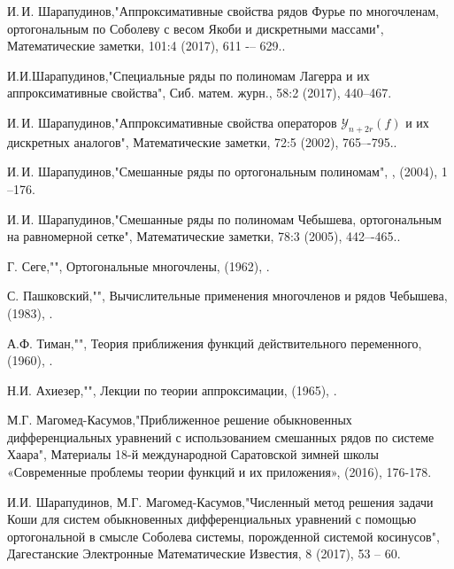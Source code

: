 \begin{thebibliography}{20}
И.\,И. Шарапудинов,"Аппроксимативные свойства рядов Фурье по многочленам, ортогональным по Соболеву с весом Якоби и дискретными массами", Математические заметки, 101:4 (2017), 611 -– 629..



И.И.Шарапудинов,"Специальные ряды по полиномам Лагерра и их аппроксимативные свойства", Сиб. матем. журн., 58:2 (2017), 440–467.



И.\,И. Шарапудинов,"Аппроксимативные свойства операторов $\mathcal{Y}_{n+2r}(f)$ и их дискретных аналогов", Математические заметки, 72:5 (2002), 765–-795..



И.\,И. Шарапудинов,"Смешанные ряды по ортогональным полиномам", ,  (2004), 1 --176.



И.\,И. Шарапудинов,"Смешанные ряды по полиномам Чебышева, ортогональным на равномерной сетке", Математические заметки, 78:3 (2005), 442–-465..



Г. Сеге,"", Ортогональные многочлены,  (1962), .



С. Пашковский,"", Вычислительные применения многочленов и рядов Чебышева,  (1983), .



А.Ф. Тиман,"", Теория приближения функций действительного переменного,  (1960), .



Н.И. Ахиезер,"", Лекции по теории аппроксимации,  (1965), .



М.Г. Магомед-Касумов,"Приближенное решение обыкновенных дифференциальных уравнений с использованием смешанных рядов по системе Хаара", Материалы 18-й международной Саратовской зимней школы «Современные проблемы теории функций и их приложения»,  (2016), 176-178.



И.И. Шарапудинов, М.Г. Магомед-Касумов,"Численный метод решения задачи Коши для систем обыкновенных дифференциальных уравнений с помощью ортогональной в смысле Соболева системы, порожденной системой косинусов", Дагестанские Электронные Математические Известия, 8 (2017), 53 -- 60.




\end{thebibliography}
